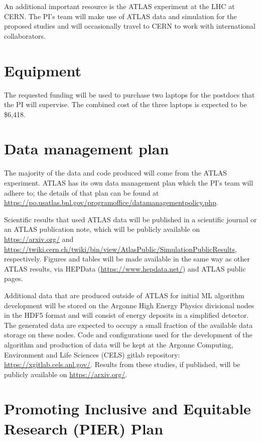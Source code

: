 \documentclass[letter, USenglish, 11pt, subfigure]{article}
\begin{document}
An additional important resource is the ATLAS experiment at the LHC at CERN. The PI's team will make use of ATLAS data and simulation for the proposed studies and will occasionally travel to CERN to work with international collaborators.

\clearpage

\section{Equipment}
The requested funding will be used to purchase two laptops for the postdocs that the PI will supervise. The combined cost of the three laptops is expected to be \$6,418.

\clearpage

\section{Data management plan}
The majority of the data and code produced will come from the ATLAS experiment. ATLAS has its own data management plan which the PI's team will adhere to; the details of that plan can be found at \url{https://po.usatlas.bnl.gov/programoffice/datamanagementpolicy.php}.

Scientific results that used ATLAS data will be published in a scientific journal or an ATLAS publication note, which will be publicly available on \url{https://arxiv.org/} and \url{https://twiki.cern.ch/twiki/bin/view/AtlasPublic/SimulationPublicResults}, respectively. Figures and tables will be made available in the same way as other ATLAS results, via HEPData (\url{https://www.hepdata.net/}) and ATLAS public pages. 

Additional data that are produced outside of ATLAS for initial ML algorithm development will be stored on the Argonne High Energy Physics divisional nodes in the HDF5 format and will consist of energy deposits in a simplified detector. The generated data are expected to occupy a small fraction of the available data storage on these nodes. Code and configurations used for the development of the algorithm and production of data will be kept at the Argonne Computing, Environment and Life Sciences (CELS) gitlab repository: \url{https://xgitlab.cels.anl.gov/}. Results from these studies, if published, will be publicly available on \url{https://arxiv.org/}. 

\clearpage

\section{Promoting Inclusive and Equitable Research (PIER) Plan}
\end{document}
